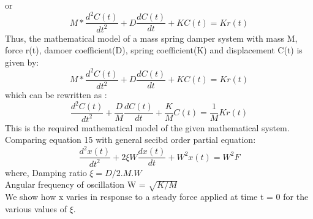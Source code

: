 \documentclass[10pt,journal,cspaper,compsoc]{IEEEtran}
\begin{document}
 or
 \begin{equation*}
  M * \frac{d^2C(t)}{dt^2} + D \frac{dC(t)}{dt} + K C(t) = Kr(t)
 \end{equation*}
 Thus, the mathematical model of a mass spring damper system with mass M, force r(t), damoer coefficient(D), spring coefficient(K) and displacement C(t) is given by: 
 \begin{equation}
  M * \frac{d^2C(t)}{dt^2} + D \frac{dC(t)}{dt} + K C(t) = Kr(t)
 \end{equation}
 which can be rewritten as :
 \begin{equation}
  \frac{d^2C(t)}{dt^2} + \frac{D}{M} \frac{dC(t)}{dt} + \frac{K}{M} C(t) = \frac{1}{M} Kr(t)
 \end{equation}
 This is the required mathematical model of the given mathematical system. Comparing equation 15 with general secibd order partial equation:
 \begin{equation}
  \frac{d^2x(t)}{dt^2} + 2 \xi W \frac{dx(t)}{dt} + W^2 x(t) = W^2 F
 \end{equation}
 where, Damping ratio  
 \begin{math}
  \xi = D/2 . M . W
 \end{math}
 \\Angular frequency of oscillation W = 
 \begin{math}
  \sqrt{K/M}
 \end{math} 
 \\We show how x varies in response to a steady force applied at time t = 0 for the various values of \begin{math}
  \xi .
 \end{math}
 \cite{lab4}
\end{document}
